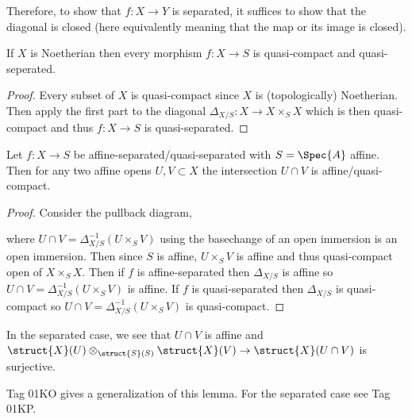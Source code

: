 \documentclass[12pt]{article}
\begin{document}
\begin{rmk}
Therefore, to show that $f : X \to Y$ is separated, it suffices to show that the diagonal is closed (here equivalently meaning that the map or its image is closed). 
\end{rmk}

\begin{lemma}
If $X$ is Noetherian then every morphism $f : X \to S$ is quasi-compact and quasi-seperated. 
\end{lemma}

\begin{proof}
Every subset of $X$ is quasi-compact since $X$ is (topologically) Noetherian. Then apply the first part to the diagonal $\Delta_{X/S} : X \to X \times_S X$ which is then quasi-compact and thus $f : X \to S$ is quasi-separated.
\end{proof}

\begin{lemma}
Let $f : X \to S$ be affine-separated/quasi-separated with $S = \Spec{A}$ affine. Then for any two affine opens $U, V \subset X$ the intersection $U \cap V$ is affine/quasi-compact. 
\end{lemma}

\begin{proof}
Consider the pullback diagram,
\begin{center}
\end{center}
where $U \cap V = \Delta_{X/S}^{-1}(U \times_S V)$ using the basechange of an open immersion is an open immersion. Then since $S$ is affine, $U \times_S V$ is affine and thus quasi-compact open of $X \times_S X$. Then if $f$ is affine-separated then $\Delta_{X/S}$ is affine so $U \cap V = \Delta_{X/S}^{-1}(U \times_S V)$ is affine. If $f$ is quasi-separated then $\Delta_{X/S}$ is quasi-compact so $U \cap V = \Delta_{X/S}^{-1}(U \times_S V)$ is quasi-compact.
\end{proof}

\begin{rmk}
In the separated case, we see that $U \cap V$ is affine and $\struct{X}(U) \otimes_{\struct{S}(S)} \struct{X}(V) \to \struct{X}(U \cap V)$ is surjective.
\end{rmk}

\begin{rmk}
Tag 01KO gives a generalization of this lemma. For the separated case see Tag 01KP.
\end{rmk}
\end{document}
